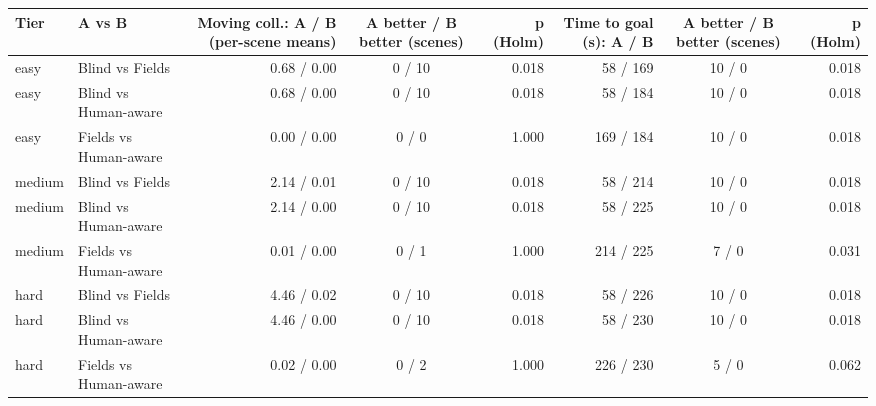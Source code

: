 \begin{tabular}{llrcrrcr}
\toprule
Tier & A vs B & Moving coll.: A / B (per-scene means) & A better / B better (scenes) & p (Holm) & Time to goal (s): A / B & A better / B better (scenes) & p (Holm) \\
\midrule
easy & Blind vs Fields & 0.68 / 0.00 & 0 / 10 & 0.018 & 58 / 169 & 10 / 0 & 0.018 \\
easy & Blind vs Human-aware & 0.68 / 0.00 & 0 / 10 & 0.018 & 58 / 184 & 10 / 0 & 0.018 \\
easy & Fields vs Human-aware & 0.00 / 0.00 & 0 / 0 & 1.000 & 169 / 184 & 10 / 0 & 0.018 \\
medium & Blind vs Fields & 2.14 / 0.01 & 0 / 10 & 0.018 & 58 / 214 & 10 / 0 & 0.018 \\
medium & Blind vs Human-aware & 2.14 / 0.00 & 0 / 10 & 0.018 & 58 / 225 & 10 / 0 & 0.018 \\
medium & Fields vs Human-aware & 0.01 / 0.00 & 0 / 1 & 1.000 & 214 / 225 & 7 / 0 & 0.031 \\
hard & Blind vs Fields & 4.46 / 0.02 & 0 / 10 & 0.018 & 58 / 226 & 10 / 0 & 0.018 \\
hard & Blind vs Human-aware & 4.46 / 0.00 & 0 / 10 & 0.018 & 58 / 230 & 10 / 0 & 0.018 \\
hard & Fields vs Human-aware & 0.02 / 0.00 & 0 / 2 & 1.000 & 226 / 230 & 5 / 0 & 0.062 \\
\bottomrule
\end{tabular}
